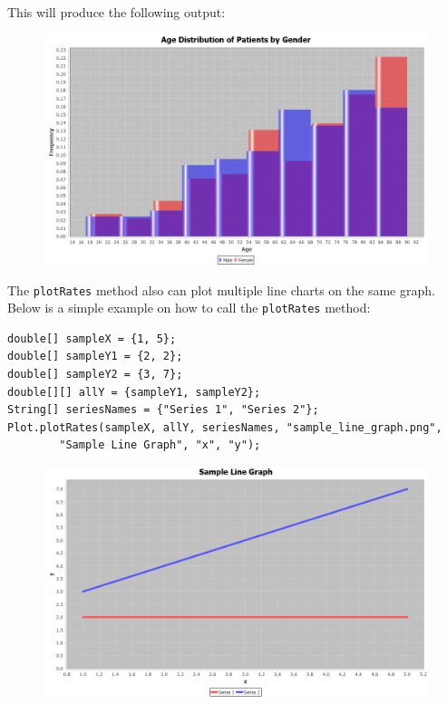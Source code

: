 \documentclass{article}
\begin{document}
This will produce the following output:
\begin{figure}[H]
\includegraphics[scale=0.3]{ICU_agesG.png}
\centering
\end{figure}

The \verb|plotRates| method also can plot multiple line charts on the same graph. Below is a simple example on how to call the \verb|plotRates| method:

\begin{lstlisting}
double[] sampleX = {1, 5};
double[] sampleY1 = {2, 2};
double[] sampleY2 = {3, 7};
double[][] allY = {sampleY1, sampleY2};
String[] seriesNames = {"Series 1", "Series 2"};
Plot.plotRates(sampleX, allY, seriesNames, "sample_line_graph.png", 
		"Sample Line Graph", "x", "y");
\end{lstlisting}

\begin{figure}[H]
\includegraphics[scale=0.3]{sample_line_graph.png}
\centering
\end{figure}
\end{document}
